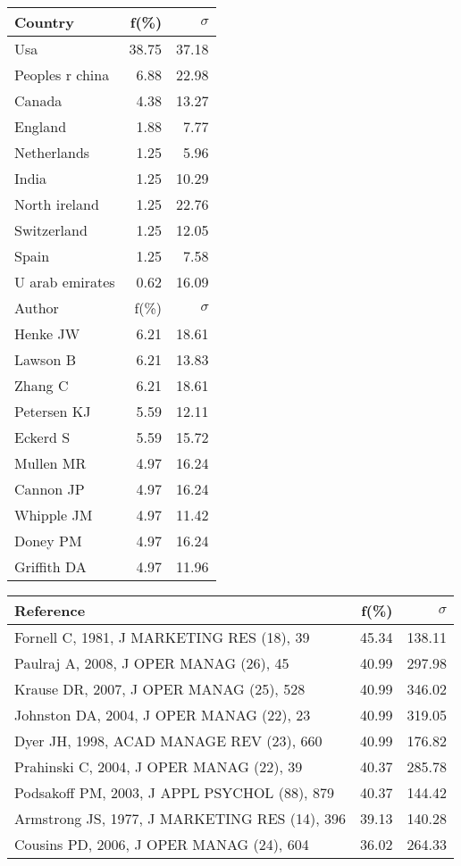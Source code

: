 \documentclass[a4paper,11pt]{report}
\begin{document}
\begin{landscape}
\begin{table}[!ht]
{\begin{tabular}{|l r r|}
Country & f(\%) & $\sigma$\\
\hline
Usa & 38.75 & 37.18\\
Peoples r china & 6.88 & 22.98\\
Canada & 4.38 & 13.27\\
England & 1.88 & 7.77\\
Netherlands & 1.25 & 5.96\\
India & 1.25 & 10.29\\
North ireland & 1.25 & 22.76\\
Switzerland & 1.25 & 12.05\\
Spain & 1.25 & 7.58\\
U arab emirates & 0.62 & 16.09\\
\hline
\hline
Author & f(\%) & $\sigma$\\
\hline
Henke JW & 6.21 & 18.61\\
Lawson B & 6.21 & 13.83\\
Zhang C & 6.21 & 18.61\\
Petersen KJ & 5.59 & 12.11\\
Eckerd S & 5.59 & 15.72\\
Mullen MR & 4.97 & 16.24\\
Cannon JP & 4.97 & 16.24\\
Whipple JM & 4.97 & 11.42\\
Doney PM & 4.97 & 16.24\\
Griffith DA & 4.97 & 11.96\\
\hline
\end{tabular}
}
{\scriptsize\begin{tabular}{|l r r|}
\hline
Reference & f(\%) & $\sigma$\\
\hline
Fornell C, 1981, J MARKETING RES (18), 39 & 45.34 & 138.11\\
Paulraj A, 2008, J OPER MANAG (26), 45 & 40.99 & 297.98\\
Krause DR, 2007, J OPER MANAG (25), 528 & 40.99 & 346.02\\
Johnston DA, 2004, J OPER MANAG (22), 23 & 40.99 & 319.05\\
Dyer JH, 1998, ACAD MANAGE REV (23), 660 & 40.99 & 176.82\\
Prahinski C, 2004, J OPER MANAG (22), 39 & 40.37 & 285.78\\
Podsakoff PM, 2003, J APPL PSYCHOL (88), 879 & 40.37 & 144.42\\
Armstrong JS, 1977, J MARKETING RES (14), 396 & 39.13 & 140.28\\
Cousins PD, 2006, J OPER MANAG (24), 604 & 36.02 & 264.33\\

\end{tabular}}
\end{table}
\end{landscape}
\end{document}
